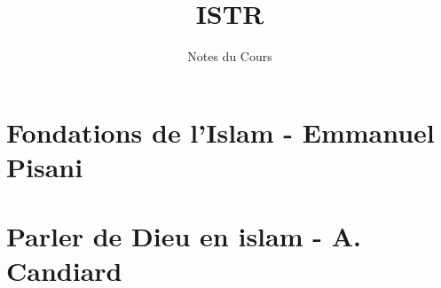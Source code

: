 \documentclass[oneside,10pt]{book} %
\title{ISTR}
\author{Notes du Cours}
\begin{document}


\maketitle



\setcounter{page}{1}
\begin{fullwidth}
\tableofcontents
\end{fullwidth}

\setcounter{page}{1}
 
 
 
\mainmatter

\part{Fondations de l'Islam - Emmanuel Pisani}
 
\FloatBarrier







%
%
\part{Parler de Dieu en islam - A. Candiard}
 
 
 
 
  
  
  
  
 
\end{document}
